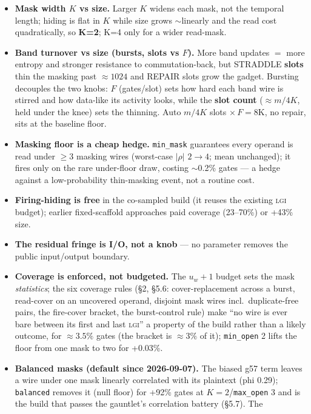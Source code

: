 \documentclass[11pt]{article}
\newcommand{\g}{\textsf{g57}}
\newcommand{\doc}[1]{\texttt{#1}}
\newcommand{\lgi}{\textsc{lgi}}
\begin{document}
\begin{itemize}
\item \textbf{Mask width $K$ vs size.} Larger $K$ widens each mask, not the
  temporal length; hiding is flat in $K$ while size grows $\sim$linearly and the
  read cost quadratically, so \textbf{K=2}; K=4 only for a wider read-mask.
\item \textbf{Band turnover vs size (bursts, slots vs $F$).} More band updates $=$
  more entropy and stronger resistance to commutation-back, but STRADDLE
  \textbf{slots} thin the masking past $\approx1024$ and REPAIR slots grow the
  gadget. Bursting decouples the two knobs: $F$ (gates/slot) sets how hard each band
  wire is stirred and how data-like its activity looks, while the \textbf{slot
  count} ($\approx m/4K$, held under the knee) sets the thinning. Auto $m/4K$ slots
  $\times\,F=8\mathrm{K}$, no repair, sits at the baseline floor.
\item \textbf{Masking floor is a cheap hedge.} \doc{min\_mask} guarantees every
  operand is read under $\ge3$ masking wires (worst-case $|\rho|$ $2\to4$; mean
  unchanged); it fires only on the rare under-floor draw, costing $\sim$0.2\% gates
  --- a hedge against a low-probability thin-masking event, not a routine cost.
\item \textbf{Firing-hiding is free} in the co-sampled build (it reuses the
  existing \lgi{} budget); earlier fixed-scaffold approaches paid coverage
  (23--70\%) or +43\% size.
\item \textbf{The residual fringe is I/O, not a knob} --- no parameter removes the
  public input/output boundary.
\item \textbf{Coverage is enforced, not budgeted.} The $u_w{+}1$ budget sets the
  mask \emph{statistics}; the six coverage rules (\S2, \S5.6: cover-replacement
  across a burst, read-cover on an uncovered operand, disjoint mask wires incl.\
  duplicate-free pairs, the fire-cover bracket, the burst-control rule) make ``no wire is ever bare between its first and last \lgi'' a property of the
  build rather than a likely outcome, for ${\approx}3.5\%$ gates (the bracket is
  ${\approx}3\%$ of it); \doc{min\_open} 2 lifts the floor from one mask to two for
  +0.03\%.
\item \textbf{Balanced masks (default since 2026-09-07).} The biased \g{} term leaves
  a wire under one mask linearly correlated with its plaintext (phi 0.29);
  \doc{balanced} removes it (null floor) for +92\% gates at $K{=}2$/\doc{max\_open} 3
  and is the build that passes the gauntlet's correlation battery (\S5.7). The

\end{itemize}
\end{document}
